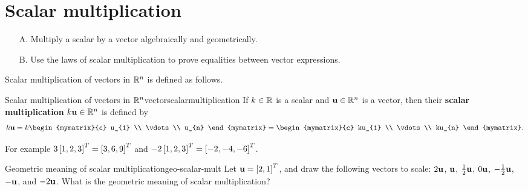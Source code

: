 \section{Scalar multiplication}

\begin{outcome}
\begin{enumerate}
\item[A.] Multiply a scalar by a vector algebraically and geometrically.
\item[B.] Use the laws of scalar multiplication to prove equalities
  between vector expressions.
\end{enumerate}
\end{outcome}

Scalar multiplication of vectors in $\mathbb{R}^n$ is defined as 
follows.

\begin{definition}{Scalar multiplication of vectors in $\mathbb{R}^n$}{vectorscalarmultiplication}
  If $k\in\mathbb{R}$ is a scalar and $\mbox{\bf u}\in \mathbb{R}^{n}$ is a vector, then
  their
  \textbf{scalar multiplication}
  $k\mbox{\bf u}\in \mathbb{R}^{n}$ is defined by
  \begin{equation*}
    k\vect{u}=k\begin{mymatrix}{c}
      u_{1} \\
      \vdots \\
      u_{n}
    \end{mymatrix} = \begin{mymatrix}{c}
      ku_{1} \\
      \vdots \\
      ku_{n}
    \end{mymatrix}.
  \end{equation*}
\end{definition}

For example $3 \left[ 1, 2, 3 \right]^T = \left[ 3, 6, 9 \right]^T$ and
$-2\left[ 1, 2, 3 \right]^T = \left[ -2, -4, -6 \right]^T$.

\begin{example}{Geometric meaning of scalar multiplication}{geo-scalar-mult}
  Let $\mbox{\bf u}=\left[2,1\right]^T$, and draw the following vectors to scale:
  $2\mbox{\bf u}$, $\mbox{\bf u}$, $\frac{1}{2}\mbox{\bf u}$, $0\mbox{\bf u}$,
  $-\frac{1}{2}\mbox{\bf u}$, $-\mbox{\bf u}$, and $-2\mbox{\bf u}$.  What is the
  geometric meaning of scalar multiplication?
\end{example}

